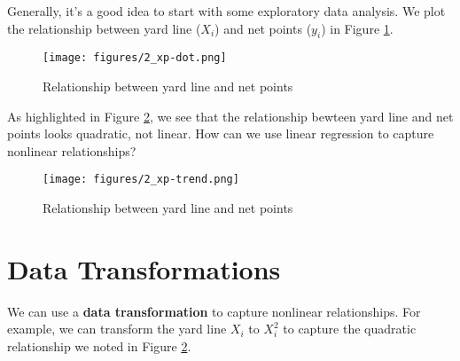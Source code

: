 \documentclass[twoside]{article}
\theoremstyle{definition}
\begin{document}
Generally, it's a good idea to start with some exploratory data analysis. We plot the relationship between yard line ($X_i$) and net points ($y_i$) in Figure \ref{fig:xp-dot}.
\begin{figure}[h]
    \centering
    \texttt{[image: figures/2\_xp-dot.png]}
    \caption{Relationship between yard line and net points}
    \label{fig:xp-dot}
\end{figure}
As highlighted in Figure \ref{fig:xp-trend}, we see that the relationship bewteen yard line and net points looks quadratic, not linear. How can we use linear regression to capture nonlinear relationships?
\begin{figure}[h]
    \centering
    \texttt{[image: figures/2\_xp-trend.png]}
    \caption{Relationship between yard line and net points}
    \label{fig:xp-trend}
\end{figure}

\section{Data Transformations}

We can use a \textbf{data transformation} to capture nonlinear relationships. For example, we can transform the yard line $X_i$ to $X_i^2$ to capture the quadratic relationship we noted in Figure \ref{fig:xp-trend}.
\end{document}
